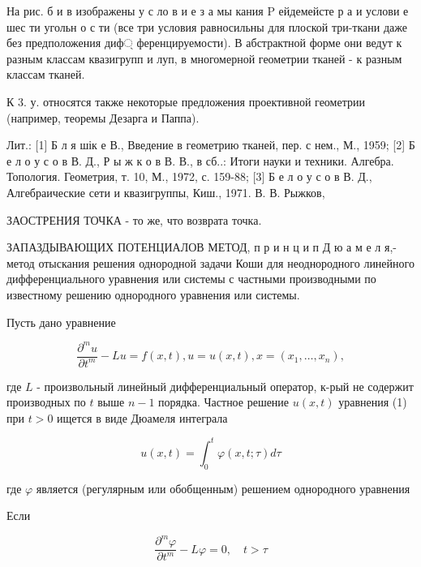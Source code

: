 \documentclass[10pt]{article}
\begin{document}
На рис. б и в изображены у с ло в и е з а мы кания $\mathrm{P}$ ейдемейсте р а и услови е шес ти угольн о с ти (все три условия равносильны для плоской три-ткани даже без предположения диф্ ференцируемости). В абстрактной форме они ведут к разным классам квазигрупп и луп, в многомерной геометрии тканей - к разным классам тканей.



К 3. у. относятся также некоторые предложения проективной геометрии (например, теоремы Дезарга и Паппа).



Лит.: [1] Б л я шік е В., Введение в геометрию тканей, пер. с нем., М., 1959; [2] Б е л о у с о в В. Д., Р ы ж к о в В. В., в сб..: Итоги науки и техники. Алгебра. Топология. Геометрия, т. 10, М., 1972, с. 159-88; [3] Б е л о у с о в В. Д., Алгебраические сети и квазигруппы, Киш., 1971. В. В. Рыжков,



ЗАОСТРЕНИЯ ТОЧКА - то же, что возврата точка.



ЗАПАЗДЫВАЮЩИХ ПОТЕНЦИАЛОВ МЕТОД, п р и н ц и п Д ю а м е л я,- метод отыскания решения однородной задачи Коши для неоднородного линейного дифференциального уравнения или системы с частными производными по известному решению однородного уравнения или системы.



Пусть дано уравнение



\[

\frac{\partial^{m} u}{\partial t^{m}}-L u=f(x, t), u=u(x, t), x=\left(x_{1}, \ldots, x_{n}\right),

\]



где $L$ - произвольный линейный дифференциальный оператор, к-рый не содержит производных по $t$ выше $n-1$ порядка. Частное решение $u(x, t)$ уравнения (1) при $t>0$ ищется в виде Дюамеля интеграла



\[

u(x, t)=\int_{0}^{t} \varphi(x, t ; \tau) d \tau

\]



где $\varphi$ является (регулярным или обобщенным) решением однородного уравнения



Если



\[

\frac{\partial^{m} \varphi}{\partial t^{m}}-L \varphi=0, \quad t>\tau

\]
\end{document}
